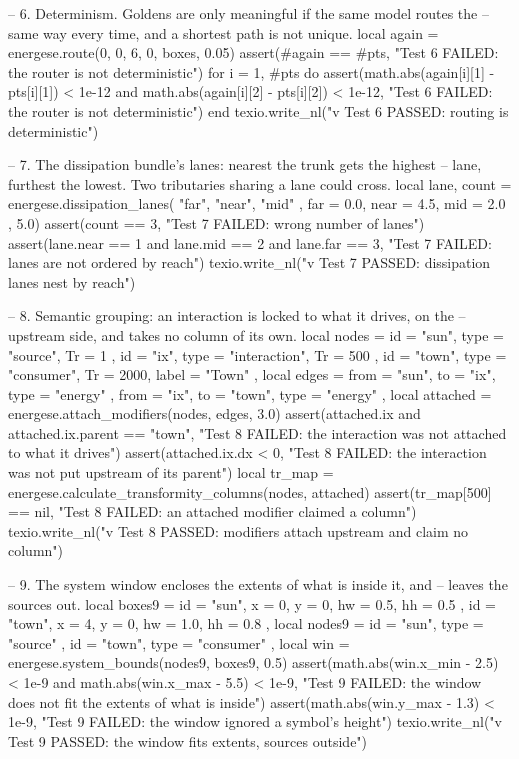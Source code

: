\documentclass{article}
\begin{document}
\begin{luacode*}
    -- 6. Determinism. Goldens are only meaningful if the same model routes the
    --    same way every time, and a shortest path is not unique.
    local again = energese.route(0, 0, 6, 0, boxes, 0.05)
    assert(#again == #pts, "Test 6 FAILED: the router is not deterministic")
    for i = 1, #pts do
        assert(math.abs(again[i][1] - pts[i][1]) < 1e-12
           and math.abs(again[i][2] - pts[i][2]) < 1e-12,
           "Test 6 FAILED: the router is not deterministic")
    end
    texio.write_nl("v Test 6 PASSED: routing is deterministic")

    -- 7. The dissipation bundle's lanes: nearest the trunk gets the highest
    --    lane, furthest the lowest. Two tributaries sharing a lane could cross.
    local lane, count = energese.dissipation_lanes(
        { "far", "near", "mid" },
        { far = 0.0, near = 4.5, mid = 2.0 }, 5.0)
    assert(count == 3, "Test 7 FAILED: wrong number of lanes")
    assert(lane.near == 1 and lane.mid == 2 and lane.far == 3,
           "Test 7 FAILED: lanes are not ordered by reach")
    texio.write_nl("v Test 7 PASSED: dissipation lanes nest by reach")

    -- 8. Semantic grouping: an interaction is locked to what it drives, on the
    --    upstream side, and takes no column of its own.
    local nodes = {
        { id = "sun", type = "source", Tr = 1 },
        { id = "ix", type = "interaction", Tr = 500 },
        { id = "town", type = "consumer", Tr = 2000, label = "Town" },
    }
    local edges = {
        { from = "sun", to = "ix", type = "energy" },
        { from = "ix", to = "town", type = "energy" },
    }
    local attached = energese.attach_modifiers(nodes, edges, 3.0)
    assert(attached.ix and attached.ix.parent == "town",
           "Test 8 FAILED: the interaction was not attached to what it drives")
    assert(attached.ix.dx < 0, "Test 8 FAILED: the interaction was not put upstream of its parent")
    local tr_map = energese.calculate_transformity_columns(nodes, attached)
    assert(tr_map[500] == nil, "Test 8 FAILED: an attached modifier claimed a column")
    texio.write_nl("v Test 8 PASSED: modifiers attach upstream and claim no column")

    -- 9. The system window encloses the extents of what is inside it, and
    --    leaves the sources out.
    local boxes9 = {
        { id = "sun", x = 0, y = 0, hw = 0.5, hh = 0.5 },
        { id = "town", x = 4, y = 0, hw = 1.0, hh = 0.8 },
    }
    local nodes9 = {
        { id = "sun", type = "source" },
        { id = "town", type = "consumer" },
    }
    local win = energese.system_bounds(nodes9, boxes9, 0.5)
    assert(math.abs(win.x_min - 2.5) < 1e-9 and math.abs(win.x_max - 5.5) < 1e-9,
           "Test 9 FAILED: the window does not fit the extents of what is inside")
    assert(math.abs(win.y_max - 1.3) < 1e-9,
           "Test 9 FAILED: the window ignored a symbol's height")
    texio.write_nl("v Test 9 PASSED: the window fits extents, sources outside")


\end{luacode*}
\end{document}
